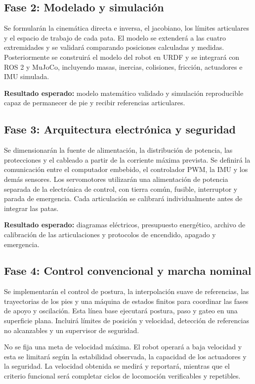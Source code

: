 \subsection{Fase 2: Modelado y simulación}

Se formularán la cinemática directa e inversa, el jacobiano, los límites
articulares y el espacio de trabajo de cada pata. El modelo se extenderá a las
cuatro extremidades y se validará comparando posiciones calculadas y medidas.
Posteriormente se construirá el modelo del robot en URDF y se integrará con ROS
2 y MuJoCo, incluyendo masas, inercias, colisiones, fricción, actuadores e IMU
simulada.

\textbf{Resultado esperado:} modelo matemático validado y simulación
reproducible capaz de permanecer de pie y recibir referencias articulares.

\subsection{Fase 3: Arquitectura electrónica y seguridad}

Se dimensionarán la fuente de alimentación, la distribución de potencia, las
protecciones y el cableado a partir de la corriente máxima prevista. Se definirá
la comunicación entre el computador embebido, el controlador PWM, la IMU y los
demás sensores. Los servomotores utilizarán una alimentación de potencia
separada de la electrónica de control, con tierra común, fusible, interruptor y
parada de emergencia. Cada articulación se calibrará individualmente antes de
integrar las patas.

\textbf{Resultado esperado:} diagramas eléctricos, presupuesto energético,
archivo de calibración de las articulaciones y protocolos de encendido, apagado
y emergencia.

\subsection{Fase 4: Control convencional y marcha nominal}

Se implementarán el control de postura, la interpolación suave de referencias,
las trayectorias de los pies y una máquina de estados finitos para coordinar las
fases de apoyo y oscilación. Esta línea base ejecutará postura, paso y gateo en
una superficie plana. Incluirá límites de posición y velocidad, detección de
referencias no alcanzables y un supervisor de seguridad.

No se fija una meta de velocidad máxima. El robot operará a baja velocidad y
esta se limitará según la estabilidad observada, la capacidad de los actuadores
y la seguridad. La velocidad obtenida se medirá y reportará, mientras que el
criterio funcional será completar ciclos de locomoción verificables y
repetibles.

